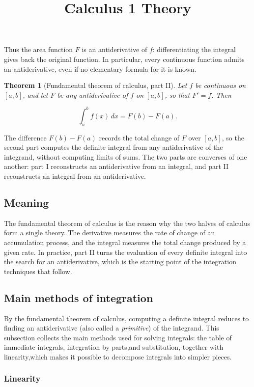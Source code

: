 \documentclass[11pt,a4paper]{article} \usepackage[T1]{fontenc}
\theoremstyle{plain} \newtheorem{theorem}{Theorem} \title{Calculus 1 Theory}
\begin{document}
Thus the area function $F$ is an antiderivative of $f$: differentiating the
integral gives back the original function. In particular, every continuous
function admits an antiderivative, even if no elementary formula for it is
known.

\begin{theorem}
[Fundamental theorem of calculus, part II] Let $f$ be continuous on $[a,b]$,
and let $F$ be any antiderivative of $f$ on $[a,b]$, so that $F'=f$. Then

\[
\int_a^b f(x)\,dx = F(b) - F(a).
\]

\end{theorem}

The difference $F(b)-F(a)$ records the total change of $F$ over $[a,b]$, so the
second part computes the definite integral from any antiderivative of the
integrand, without computing limits of sums. The two parts are converses of one
another: part I reconstructs an antiderivative from an integral, and part II
reconstructs an integral from an antiderivative.

\subsection*{Meaning}

The fundamental theorem of calculus is the reason why the two halves of
calculus form a single theory. The derivative measures the rate of change of an
accumulation process, and the integral measures the total change produced by a
given rate. In practice, part II turns the evaluation of every definite
integral into the search for an antiderivative, which is the starting point of
the integration techniques that follow.

\subsection {Main methods of integration}

By the fundamental theorem of calculus, computing a definite integral reduces
to finding an antiderivative (also called a \emph{primitive}) of the integrand.
This subsection collects the main methods used for solving integrals: the table
of immediate integrals, integration by parts,and substitution, together with
linearity,which makes it possible to decompose integrals into simpler pieces.

\subsubsection {Linearity}
\end{document}
